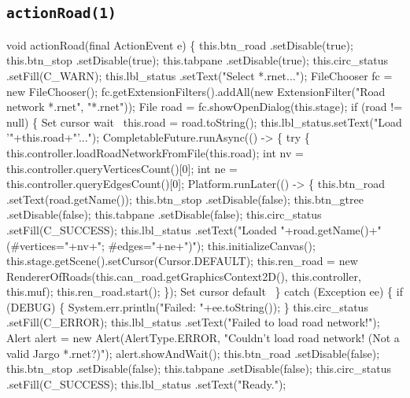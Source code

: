 \subsection{\texttt{actionRoad(1)}}
\nwenddocs{}\endmoddef{}
void actionRoad(final ActionEvent e) \{
  this.btn_road     .setDisable(true);
  this.btn_stop     .setDisable(true);
  this.tabpane      .setDisable(true);
  this.circ_status  .setFill(C_WARN);
  this.lbl_status   .setText("Select *.rnet...");
  FileChooser fc = new FileChooser();
  fc.getExtensionFilters().addAll(new ExtensionFilter("Road network *.rnet", "*.rnet"));
  File road = fc.showOpenDialog(this.stage);
  if (road != null) \{
    \LA{}Set cursor wait~{\nwtagstyle{}}\RA{}
    this.road = road.toString();
    this.lbl_status.setText("Load '"+this.road+"'...");
    CompletableFuture.runAsync(() -> \{
      try \{
        this.controller.loadRoadNetworkFromFile(this.road);
        int nv = this.controller.queryVerticesCount()[0];
        int ne = this.controller.queryEdgesCount()[0];
        Platform.runLater(() -> \{
          this.btn_road     .setText(road.getName());
          this.btn_stop     .setDisable(false);
          this.btn_gtree    .setDisable(false);
          this.tabpane      .setDisable(false);
          this.circ_status  .setFill(C_SUCCESS);
          this.lbl_status   .setText("Loaded "+road.getName()+" (#vertices="+nv+"; #edges="+ne+")");
          this.initializeCanvas();
          this.stage.getScene().setCursor(Cursor.DEFAULT);
          this.ren_road = new RendererOfRoads(this.can_road.getGraphicsContext2D(), this.controller, this.muf);
          this.ren_road.start();
        \});
        \LA{}Set cursor default~{\nwtagstyle{}}\RA{}
      \} catch (Exception ee) \{
        if (DEBUG) \{
          System.err.println("Failed: "+ee.toString());
        \}
        this.circ_status  .setFill(C_ERROR);
        this.lbl_status   .setText("Failed to load road network!");
        Alert alert = new Alert(AlertType.ERROR, "Couldn't load road network! (Not a valid Jargo *.rnet?)");
        alert.showAndWait();
        this.btn_road     .setDisable(false);
        this.btn_stop     .setDisable(false);
        this.tabpane      .setDisable(false);
        this.circ_status  .setFill(C_SUCCESS);
        this.lbl_status   .setText("Ready.");
